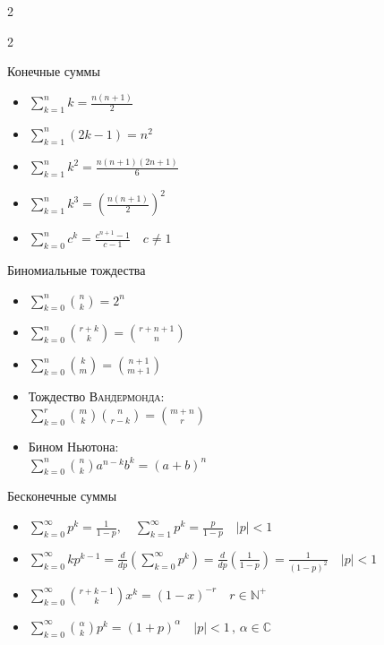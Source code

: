\documentclass[landscape]{article}
\newenvironment{titemize}[1]{
  \begin{minipage}[h]{\columnwidth}
    #1
    \begin{itemize}
}{
    \end{itemize}
  \end{minipage}
}
\begin{document}
\begin{multicols*}{2}
\begin{multicols}{2}
  \begin{titemize}{Конечные суммы}
  \item $\displaystyle\sum_{k=1}^n k = \frac{n(n+1)}{2}$
  \item $\displaystyle\sum_{k=1}^n (2k-1) = n^2$
  \item $\displaystyle\sum_{k=1}^n k^2 = \frac{n(n+1)(2n+1)}{6}$
  \item $\displaystyle\sum_{k=1}^n k^3 = \left(\frac{n(n+1)}{2}\right)^2$
  \item $\displaystyle\sum_{k=0}^n c^k = \frac{c^{n+1}-1}{c-1} \quad c\neq1$
\end{titemize}

\begin{titemize}{Биномиальные тождества}
  \item $\displaystyle\sum_{k=0}^n \binom{n}{k} = 2^n$
  \item $\displaystyle\sum_{k=0}^n \binom{r+k}{k}=\binom{r+n+1}{n}$
  \item $\displaystyle\sum_{k=0}^n \binom{k}{m}=\binom{n+1}{m+1}$
  \item Тождество \textsc{Вандермонда}:\\
    $\displaystyle\sum_{k=0}^r \binom{m}{k}\binom{n}{r-k}=\binom{m+n}{r}$
  \item Бином Ньютона:\\
    $\displaystyle\sum_{k=0}^n \binom{n}{k}a^{n-k}b^k = (a+b)^n$
\end{titemize}
\end{multicols}

Бесконечные суммы
\begin{itemize}
  \item $\displaystyle\sum_{k=0}^\infty p^k = \frac{1}{1-p},
    \quad \sum_{k=1}^\infty p^k = \frac{p}{1-p} \quad |p|<1$
  \item $\displaystyle\sum_{k=0}^\infty kp^{k-1}
    = \displaystyle\frac{d}{dp}\left(\sum_{k=0}^\infty p^k\right)
    = \displaystyle\frac{d}{dp}\left(\frac{1}{1-p}\right)
    = \frac{1}{(1-p)^2} \quad |p|<1$
  \item $\displaystyle\sum_{k=0}^\infty \binom{r+k-1}{k} x^k = (1-x)^{-r}
    \quad r\in\mathbb N^+$
  \item $\displaystyle\sum_{k=0}^\infty \binom{\alpha}{k} p^k
    = (1+p)^\alpha \quad |p|<1\,,\,\alpha \in \mathbb C$
\end{itemize}

%


\end{multicols*}
\end{document}
